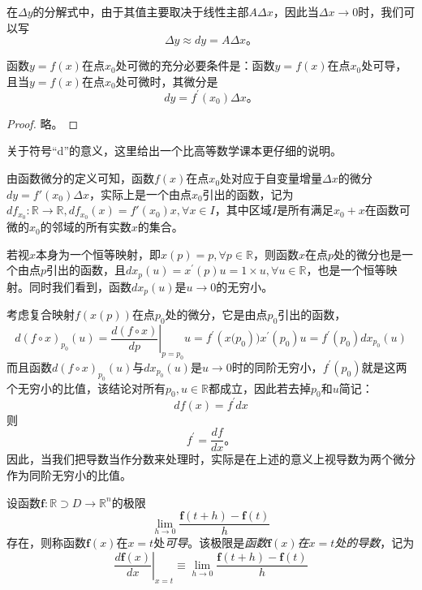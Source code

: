 \documentclass[../main.tex]{subfiles}
\begin{document}
在$\Delta y$的分解式中，由于其值主要取决于线性主部$A\Delta x$，因此当$\Delta x\to 0$时，我们可以写
\[
    \Delta y\approx dy=A\Delta x\text{。}
\]

\begin{theorem}\label{thm:II.4.5}\cite[定理2.5.1]{华工高数2009上}
    函数$y=f\left(x\right)$在点$x_0$处可微的充分必要条件是：函数$y=f\left(x\right)$在点$x_0$处可导，且当$y=f\left(x\right)$在点$x_0$处可微时，其微分是
    \[
        dy=f^\prime\left(x_0\right)\Delta x\text{。}
    \]
\end{theorem}
\begin{proof}
    略\cite[p.~103]{华工高数2009上}。
\end{proof}

关于符号“d”的意义，这里给出一个比高等数学课本\cite[p.~104]{华工高数2009上}更仔细的说明。

由函数微分的定义可知，函数$f\left(x\right)$在点$x_0$处对应于自变量增量$\Delta x$的微分$dy=f'\left(x_0\right)\Delta x$，实际上是一个由点$x_0$引出的函数，记为$df_{x_0}:\mathbb{R}\rightarrow\mathbb{R},df_{x_0}\left(x\right)=f'\left(x_0\right)x,\forall x\in I$，其中区域$I$是所有满足$x_0+x$在函数可微的$x_0$的邻域的所有实数$x$的集合。

若视$x$本身为一个恒等映射，即$x\left(p\right)=p,\forall p\in\mathbb{R}$，则函数$x$在点$p$处的微分也是一个由点$p$引出的函数，且$dx_p\left(u\right)=x^\prime\left(p\right) u=1\times u,\forall u\in\mathbb{R}$，也是一个恒等映射。同时我们看到，函数$dx_p\left(u\right)$是$u\to 0$的无穷小。

考虑复合映射$f\left(x\left(p\right)\right)$在点$p_0$处的微分，它是由点$p_0$引出的函数，\[d\left(f\circ x\right)_{p_0}\left(u\right)=\left.\frac{d\left(f\circ x\right)}{dp}\right|_{p=p_0}u=f^\prime\left(x(p_0\right))x^\prime\left(p_0\right)u=f^\prime\left(p_0\right)dx_{p_0}\left(u\right)\]
而且函数$d\left(f\circ x\right)_{p_0}\left(u\right)$与$dx_{p_0}\left(u\right)$是$u\to 0$时的同阶无穷小，$f^\prime\left(p_0\right)$就是这两个无穷小的比值，该结论对所有$p_0,u\in\mathbb{R}$都成立，因此若去掉$p_0$和$u$简记：
\[df\left(x\right)=f^\prime dx\]
则
\[f^\prime=\frac{df}{dx}\text{。}\]
因此，当我们把导数当作分数来处理时，实际是在上述的意义上视导数为两个微分作为同阶无穷小的比值。

\begin{definition}[一元向量函数的导数]\label{def:II.4.9}
    设函数$\mathbf{f}:\mathbb{R}\supset D\rightarrow\mathbb{R}^n$的极限
    \[
        \lim_{h\to 0}\frac{\mathbf{f}\left(t+h\right)-\mathbf{f}\left(t\right)}{h}
    \]
    存在，则称函数$\mathbf{f}\left(x\right)$在$x=t$处\emph{可导}。该极限是\emph{函数$\mathbf{f}\left(x\right)$在$x=t$处的导数}，记为
    \[
        \left.\frac{d\mathbf{f}\left(x\right)}{dx}\right|_{x=t}\equiv\lim_{h\to 0}\frac{\mathbf{f}\left(t+h\right)-\mathbf{f}\left(t\right)}{h}
    \]
\end{definition}
\end{document}
